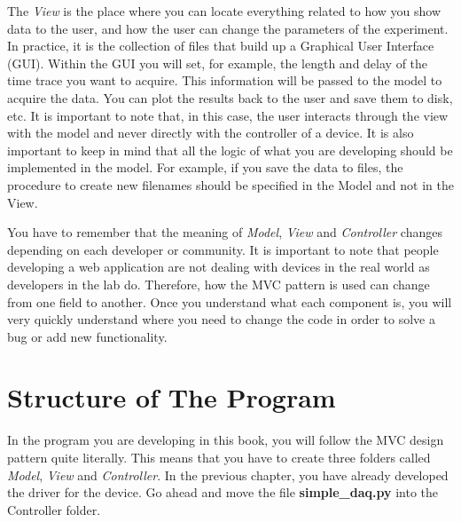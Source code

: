 The \emph{View} is the place where you can locate everything related to how you show data to the user, and how the user can change the parameters of the experiment. In practice, it is the collection of files that build up a Graphical User Interface ({GUI}). Within the {GUI} you will set, for example, the length and delay of the time trace you want to acquire. This information will be passed to the model to acquire the data. You can plot the results back to the user and save them to disk, etc. It is important to note that, in this case, the user interacts through the view with the model and never directly with the controller of a device. It is also important to keep in mind that all the logic of what you are developing should be implemented in the model. For example, if you save the data to files, the procedure to create new filenames should be specified in the Model and not in the View. 


You have to remember that the meaning of \emph{Model}, \emph{View} and \emph{Controller} changes depending on each developer or community. It
is important to note that people developing a web application are not dealing with devices in the real world as developers in the lab do. Therefore, how the {MVC} pattern is used can change from one field to another. Once you understand what each component is, you will very quickly understand where you need to change the code in order to solve a bug or add new functionality. 

\section{Structure of The Program}\label{structure-of-theprogram}
In the program you are developing in this book, you will follow the {MVC} design pattern quite literally. This means that you have to create
three folders called \emph{Model}, \emph{View} and \emph{Controller}. In the previous chapter, you have already developed the driver for the device. Go ahead and move the file \textbf{simple\_daq.py} into the Controller folder.

